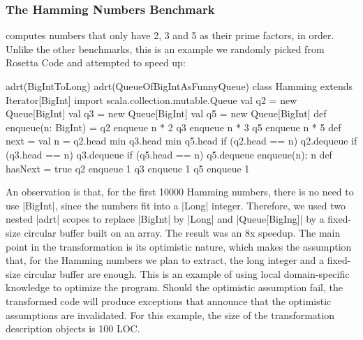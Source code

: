 \subsubsection{The Hamming Numbers Benchmark} computes numbers that only have 2, 3 and 5 as their prime factors, in order. Unlike the other benchmarks, this is an example we randomly picked from Rosetta Code \cite{rosetta-code} and attempted to speed up:

\begin{lstlisting-nobreak}
adrt(BigIntToLong) {
  adrt(QueueOfBigIntAsFunnyQueue) {
    class Hamming extends Iterator[BigInt] {
      import scala.collection.mutable.Queue
      val q2 = new Queue[BigInt]
      val q3 = new Queue[BigInt]
      val q5 = new Queue[BigInt]
      def enqueue(n: BigInt) = {
        q2 enqueue n * 2
        q3 enqueue n * 3
        q5 enqueue n * 5
      }
      def next = {
        val n = q2.head min q3.head min q5.head
        if (q2.head == n) q2.dequeue
        if (q3.head == n) q3.dequeue
        if (q5.head == n) q5.dequeue
        enqueue(n); n
      }
      def hasNext = true
      q2 enqueue 1
      q3 enqueue 1
      q5 enqueue 1
    }
  }
}
\end{lstlisting-nobreak}

An observation is that, for the first 10000 Hamming numbers, there is no need to use |BigInt|, since the numbers fit into a |Long| integer. Therefore, we used two nested |adrt| scopes to replace |BigInt| by |Long| and |Queue[BigIng]| by a fixed-size circular buffer built on an array. The result was an 8x speedup. The main point in the transformation is its optimistic nature, which makes the assumption that, for the Hamming numbers we plan to extract, the long integer and a fixed-size circular buffer are enough. This is an example of using local domain-specific knowledge to optimize the program. Should the optimistic assumption fail, the transformed code will produce exceptions that announce that the optimistic assumptions are invalidated. For this example, the size of the transformation description objects is 100 LOC.


